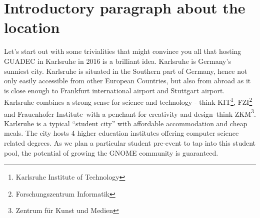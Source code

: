 \section{Introductory paragraph about the location}

Let's start out with some trivialities that might convince you all that 
hosting GUADEC in Karlsruhe in 2016 is a brilliant idea. Karlsruhe is 
Germany's sunniest city. Karlsruhe is situated in the Southern part of 
Germany, hence not only easily accessible from other European 
Countries, but also from abroad as it is close enough to Frankfurt 
international airport and Stuttgart airport. Karlsruhe combines a 
strong sense for science and technology - think KIT\footnote{Karlsruhe 
Institute of Technology}, FZI\footnote{Forschungszentrum Informatik} 
and Frauenhofer Institute–with a penchant for creativity and 
design–think ZKM\footnote{Zentrum für Kunst und Medien}. Karlsruhe is a 
typical “student city” with affordable accommodation and cheap meals. 
The city hosts 4 higher education institutes offering computer science 
related degrees. As we plan a particular student pre-event to tap into 
this student pool, the potential of growing the GNOME community is 
guaranteed.


\vfill


